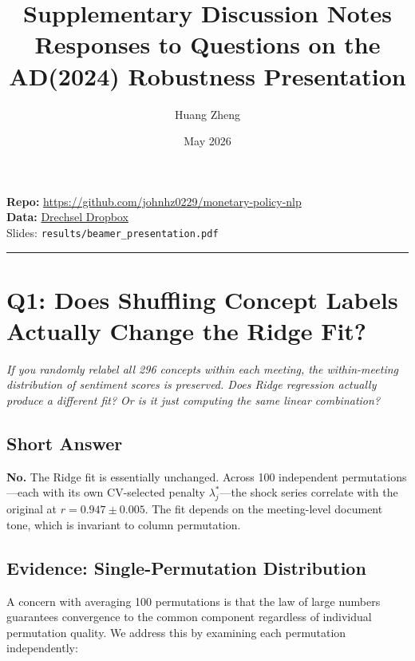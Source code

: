 \documentclass[11pt,a4paper]{article}
\title{Supplementary Discussion Notes\\[4pt] {\large Responses to Questions on the AD(2024) Robustness Presentation}}
\author{Huang Zheng}
\date{May 2026}
\begin{document}
\maketitle

\vspace{-12pt}
{\small\color{gray} \textbf{Repo:} \url{https://github.com/johnhz0229/monetary-policy-nlp} \\ \textbf{Data:} \href{https://www.dropbox.com/scl/fo/wpcddxexkpoft1hvmr4jp/AKXzKKpvicULT2xUNZSp_Jo?rlkey=nfdt0jch36hr1y55r97m1joz9&st=0u5lz9p6&dl=0}{Drechsel Dropbox} \\ Slides: \texttt{results/beamer\_presentation.pdf}}

\vspace{6pt}
\hrule
\vspace{10pt}

\section*{Q1: Does Shuffling Concept Labels Actually Change the Ridge Fit?}

\textit{If you randomly relabel all 296 concepts within each meeting, the within-meeting distribution of sentiment scores is preserved. Does Ridge regression actually produce a different fit? Or is it just computing the same linear combination?}

\subsection*{Short Answer}

\textbf{No.} The Ridge fit is essentially unchanged. Across 100 independent permutations---each with its own CV-selected penalty $\lambda_j^*$---the shock series correlate with the original at $r = 0.947 \pm 0.005$. The fit depends on the meeting-level document tone, which is invariant to column permutation.

\subsection*{Evidence: Single-Permutation Distribution}

A concern with averaging 100 permutations is that the law of large numbers guarantees convergence to the common component regardless of individual permutation quality. We address this by examining each permutation independently:
\end{document}
